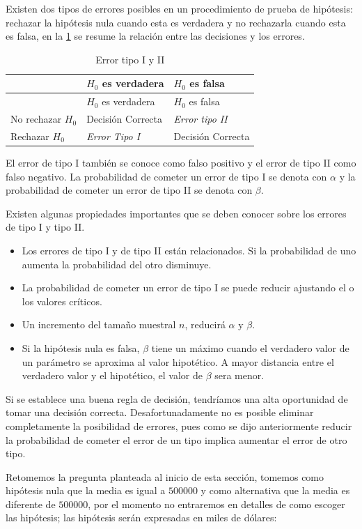 \documentclass[
]{krantz}
\providecommand{\tightlist}{%
  \setlength{\itemsep}{0pt}\setlength{\parskip}{0pt}}
\begin{document}
Existen dos tipos de errores posibles en un procedimiento de prueba de hipótesis: rechazar la hipótesis nula cuando esta es verdadera y no rechazarla cuando esta es falsa, en la \ref{tab:err} se resume la relación entre las decisiones y los errores.

\begin{longtable}[]{@{}lll@{}}
\caption{\label{tab:err}Error tipo I y II}\tabularnewline
\toprule
& \(H_0\) es verdadera & \(H_0\) es falsa\tabularnewline
\midrule
\endfirsthead
\toprule
& \(H_0\) es verdadera & \(H_0\) es falsa\tabularnewline
\midrule
\endhead
No rechazar \(H_0\) & Decisión Correcta & \emph{Error tipo II}\tabularnewline
Rechazar \(H_0\) & \emph{Error Tipo I} & Decisión Correcta\tabularnewline
\bottomrule
\end{longtable}

El error de tipo I también se conoce como falso positivo y el error de tipo II como falso negativo. La probabilidad de cometer un error de tipo I se denota con \(\alpha\) y la probabilidad de cometer un error de tipo II se denota con \(\beta\).

Existen algunas propiedades importantes que se deben conocer sobre los errores de tipo I y tipo II.

\begin{itemize}
\tightlist
\item
  Los errores de tipo I y de tipo II están relacionados. Si la probabilidad de uno aumenta la probabilidad del otro disminuye.
\item
  La probabilidad de cometer un error de tipo I se puede reducir ajustando el o los valores críticos.
\item
  Un incremento del tamaño muestral \(n\), reducirá \(\alpha\) y \(\beta\).
\item
  Si la hipótesis nula es falsa, \(\beta\) tiene un máximo cuando el verdadero valor de un parámetro se aproxima al valor hipotético. A mayor distancia
  entre el verdadero valor y el hipotético, el valor de \(\beta\) sera menor.
\end{itemize}

Si se establece una buena regla de decisión, tendríamos una alta oportunidad de tomar una decisión correcta. Desafortunadamente no es posible eliminar completamente la posibilidad de errores, pues como se dijo anteriormente reducir la probabilidad de cometer el error de un tipo implica aumentar el error de otro tipo.

Retomemos la pregunta planteada al inicio de esta sección, tomemos como hipótesis nula que la media es igual a \(500000\) y como alternativa que la media es diferente de \(500000\), por el momento no entraremos en detalles de como escoger las hipótesis; las hipótesis serán expresadas en miles de dólares:
\end{document}
